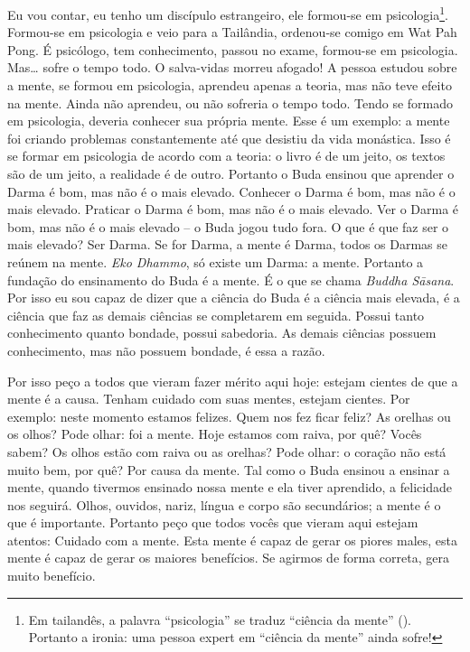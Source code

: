 Eu vou contar, eu tenho um discípulo estrangeiro, ele formou-se em
psicologia\footnote{Em tailandês, a palavra “psicologia” se traduz
“ciência da mente”
(). Portanto a
ironia: uma pessoa expert em “ciência da mente” ainda sofre!}.
Formou-se em psicologia e veio para a Tailândia, ordenou-se comigo em
Wat Pah Pong. É psicólogo, tem conhecimento, passou no exame, formou-se
em psicologia. Mas… sofre o tempo todo. O salva-vidas morreu afogado! A
pessoa estudou sobre a mente, se formou em psicologia, aprendeu apenas
a teoria, mas não teve efeito na mente. Ainda não aprendeu, ou não
sofreria o tempo todo. Tendo se formado em psicologia, deveria conhecer
sua própria mente. Esse é um exemplo: a mente foi criando problemas
constantemente até que desistiu da vida monástica. Isso é se formar em
psicologia de acordo com a teoria: o livro é de um jeito, os textos são
de um jeito, a realidade é de outro. Portanto o Buda ensinou que
aprender o Darma é bom, mas não é o mais elevado. Conhecer o Darma é
bom, mas não é o mais elevado. Praticar o Darma é bom, mas não é o mais
elevado. Ver o Darma é bom, mas não é o mais elevado
– o Buda jogou tudo fora. O que é que faz ser o mais
elevado? Ser Darma. Se for Darma, a mente é Darma, todos os Darmas se
reúnem na mente. \textit{Eko Dhammo}, só existe um Darma: a mente.
Portanto a fundação do ensinamento do Buda é a mente. É o que se chama
\textit{Buddha Sāsana}. Por isso eu sou capaz de dizer que a ciência
do Buda é a ciência mais elevada, é a ciência que faz as demais
ciências se completarem em seguida. Possui tanto conhecimento quanto
bondade, possui sabedoria. As demais ciências possuem conhecimento, mas
não possuem bondade, é essa a razão. 

Por isso peço a todos que vieram fazer mérito aqui hoje: estejam
cientes de que a mente é a causa. Tenham cuidado com suas mentes,
estejam cientes. Por exemplo: neste momento estamos felizes. Quem nos
fez ficar feliz? As orelhas ou os olhos? Pode olhar: foi a mente. Hoje
estamos com raiva, por quê? Vocês sabem? Os olhos estão com raiva ou as
orelhas? Pode olhar: o coração não está muito bem, por quê? Por causa
da mente. Tal como o Buda ensinou a ensinar a mente, quando tivermos
ensinado nossa mente e ela tiver aprendido, a felicidade nos seguirá.
Olhos, ouvidos, nariz, língua e corpo são secundários; a mente é o que
é importante. Portanto peço que todos vocês que vieram aqui estejam
atentos: Cuidado com a mente. Esta mente é capaz de gerar os piores
males, esta mente é capaz de gerar os maiores benefícios. Se agirmos de
forma correta, gera muito benefício. 

